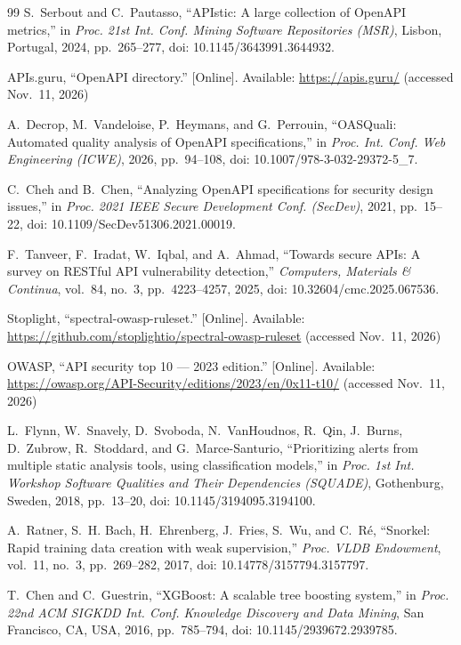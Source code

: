\documentclass[conference]{IEEEtran}
\begin{document}
\def\UrlBreaks{\do\/\do-\do.}
\begin{thebibliography}{99}
S.~Serbout and C.~Pautasso, ``APIstic: A large collection of OpenAPI metrics,'' in
\emph{Proc. 21st Int. Conf. Mining Software Repositories (MSR)}, Lisbon, Portugal, 2024,
pp.~265--277, doi: 10.1145/3643991.3644932.

APIs.guru, ``OpenAPI directory.'' [Online]. Available: \url{https://apis.guru/} (accessed Nov.~11, 2026)

A.~Decrop, M.~Vandeloise, P.~Heymans, and G.~Perrouin, ``OASQuali: Automated quality analysis
of OpenAPI specifications,'' in \emph{Proc. Int. Conf. Web Engineering (ICWE)}, 2026,
pp.~94--108, doi: 10.1007/978-3-032-29372-5\_7.

C.~Cheh and B.~Chen, ``Analyzing OpenAPI specifications for security design issues,'' in
\emph{Proc. 2021 IEEE Secure Development Conf. (SecDev)}, 2021, pp.~15--22, doi:
10.1109/SecDev51306.2021.00019.

F.~Tanveer, F.~Iradat, W.~Iqbal, and A.~Ahmad, ``Towards secure APIs: A survey on RESTful API
vulnerability detection,'' \emph{Computers, Materials \& Continua}, vol.~84, no.~3,
pp.~4223--4257, 2025, doi: 10.32604/cmc.2025.067536.

Stoplight, ``spectral-owasp-ruleset.'' [Online]. Available:
\url{https://github.com/stoplightio/spectral-owasp-ruleset} (accessed Nov.~11, 2026)

OWASP, ``API security top 10 --- 2023 edition.'' [Online]. Available:
\url{https://owasp.org/API-Security/editions/2023/en/0x11-t10/} (accessed Nov.~11, 2026)

L.~Flynn, W.~Snavely, D.~Svoboda, N.~VanHoudnos, R.~Qin, J.~Burns, D.~Zubrow, R.~Stoddard,
and G.~Marce-Santurio, ``Prioritizing alerts from multiple static analysis tools, using
classification models,'' in \emph{Proc. 1st Int. Workshop Software Qualities and Their
Dependencies (SQUADE)}, Gothenburg, Sweden, 2018, pp.~13--20, doi: 10.1145/3194095.3194100.

A.~Ratner, S.~H. Bach, H.~Ehrenberg, J.~Fries, S.~Wu, and C.~R\'e, ``Snorkel: Rapid training data
creation with weak supervision,'' \emph{Proc. VLDB Endowment}, vol.~11, no.~3, pp.~269--282, 2017,
doi: 10.14778/3157794.3157797.

T.~Chen and C.~Guestrin, ``XGBoost: A scalable tree boosting system,'' in \emph{Proc. 22nd ACM
SIGKDD Int. Conf. Knowledge Discovery and Data Mining}, San Francisco, CA, USA, 2016,
pp.~785--794, doi: 10.1145/2939672.2939785.


\end{thebibliography}
\end{document}
